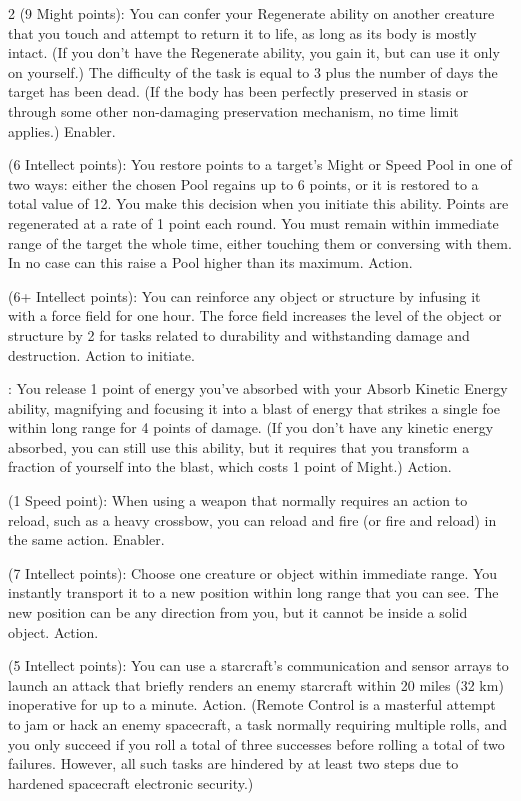 \begin{multicols}{2}
 (9 Might points): You can confer your Regenerate ability on another creature that you touch and attempt to return it to life, as long as its body is mostly intact. (If you don’t have the Regenerate ability, you gain it, but can use it only on yourself.) The difficulty of the task is equal to 3 plus the number of days the target has been dead. (If the body has been perfectly preserved in stasis or through some other non-damaging preservation mechanism, no time limit applies.) Enabler. 
 
 (6 Intellect points): You restore points to a target’s Might or Speed Pool in one of two ways: either the chosen Pool regains up to 6 points, or it is restored to a total value of 12. You make this decision when you initiate this ability. Points are regenerated at a rate of 1 point each round. You must remain within immediate range of the target the whole time, either touching them or conversing with them. In no case can this raise a Pool higher than its maximum. Action. 
 
 (6+ Intellect points): You can reinforce any object or structure by infusing it with a force field for one hour. The force field increases the level of the object or structure by 2 for tasks related to durability and withstanding damage and destruction. Action to initiate.
 
: You release 1 point of energy you’ve absorbed with your Absorb Kinetic Energy ability, magnifying and focusing it into a blast of energy that strikes a single foe within long range for 4 points of damage. (If you don’t have any kinetic energy absorbed, you can still use this ability, but it requires that you transform a fraction of yourself into the blast, which costs 1 point of Might.) Action. 
 
 (1 Speed point): When using a weapon that normally requires an action to reload, such as a heavy crossbow, you can reload and fire (or fire and reload) in the same action. Enabler. 
 
 (7 Intellect points): Choose one creature or object within immediate range. You instantly transport it to a new position within long range that you can see. The new position can be any direction from you, but it cannot be inside a solid object. Action. 
 
 (5 Intellect points): You can use a starcraft’s communication and sensor arrays to launch an attack that briefly renders an enemy starcraft within 20 miles (32 km) inoperative for up to a minute. Action. (Remote Control is a masterful attempt to jam or hack an enemy spacecraft, a task normally requiring multiple rolls, and you only succeed if you roll a total of three successes before rolling a total of two failures. However, all such tasks are hindered by at least two steps due to hardened spacecraft electronic security.)
 

\end{multicols}
